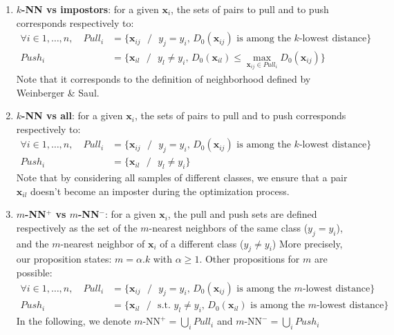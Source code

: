 \begin{enumerate}
	\item \textbf{$k$-NN vs impostors}: for a given $\textbf{x}_i$, the sets of pairs to pull and to push corresponds respectively to:
	\begin{align}
		\forall i\in 1, \ldots, n, \quad Pull_i & = \{\textbf{x}_{ij} \text{ } / \text{ }  \text{$y_j = y_i$, $D_0(\textbf{x}_{ij})$ is among the $k$-lowest distance} \} \label{eq:pull1}\\
		Push_i & = \{\textbf{x}_{il} \text{ } / \text{ } \text{$y_l \neq y_i$, } D_0(\textbf{x}_{il}) \leq \max\limits_{\textbf{x}_{ij} \in Pull_i} D_0(\textbf{x}_{ij})\} \label{eq:push1}
	\end{align}
	Note that it corresponds to the definition of neighborhood defined by Weinberger \& Saul.
	\item \textbf{$k$-NN vs all}: for a given $\textbf{x}_i$, the sets of pairs to pull and to push corresponds respectively to:	
	\begin{align}
	\forall i\in 1, \ldots, n, \quad Pull_i & = \{\textbf{x}_{ij} \text{ } / \text{ } \text{$y_j = y_i$, $D_0(\textbf{x}_{ij})$ is among the $k$-lowest distance} \} \\
	Push_i & = \{\textbf{x}_{il} \text{ } / \text{ } \text{$y_l \neq y_i$} \}
	\end{align}
	Note that by considering all samples of different classes, we ensure that a pair $\textbf{x}_{il}$ doesn't become an imposter during the optimization process.
	\item \textbf{$m$-NN$^+$ vs $m$-NN$^-$}: for a given $\textbf{x}_i$, the pull and push sets are defined respectively as 
	the set of the $m$-nearest neighbors of the same class ($y_j=y_i$), 
	and the $m$-nearest neighbor of $\textbf{x}_i$ of a different class ($y_j \neq y_i$)
	More precisely, our proposition states: $m=\alpha.k$ with $\alpha \geq 1$. Other propositions for $m$ are possible:
	\begin{align}
	\forall i\in 1, \ldots, n, \quad Pull_i & = \{\textbf{x}_{ij} \text{ } / \text{ } \text{$y_j = y_i$, $D_0(\textbf{x}_{ij})$ is among the $m$-lowest distance} \} \label{eq:mnn+}\\
	Push_i & = \{\textbf{x}_{il} \text{ } / \text{ } \text{s.t. $y_l \neq y_i$, $D_0(\textbf{x}_{il})$ is among the $m$-lowest distance} \} \label{eq:mnn-}
	\end{align}
	In the following, we denote $m\text{-NN}^+ = \bigcup\limits_{i} Pull_i$ and $m\text{-NN}^- = \bigcup\limits_{i} Push_i$
\end{enumerate}

